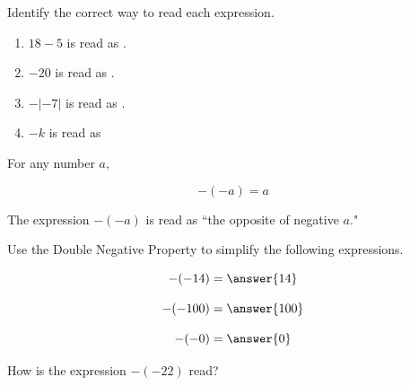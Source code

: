 \documentclass{ximera}[font=12pt]
\begin{document}
\begin{problem}
Identify the correct way to read each expression.


\begin{enumerate}
\item $18 - 5$ is read as .
\item $-20$ is read as . \\ 
\item $-|-7|$ is read as . \\ 
\item $-k$ is read as  \\ 
\end{enumerate}

\end{problem}


\begin{definition}

For any number $a,$

\[ -(-a) = a \]

The expression $-(-a)$ is read as ``the opposite of negative $a$."

\end{definition}


\begin{problem}
Use the Double Negative Property to simplify the following expressions.

\[ -(-14) = \answer{14} \] 

\[ -(-100) = \answer{100}\] 

\[ -(-0) = \answer{0} \]

\end{problem}


\begin{problem}
How is the expression $-(-22)$ read?

\begin{multipleChoice}
\end{multipleChoice}

\end{problem}
\end{document}
